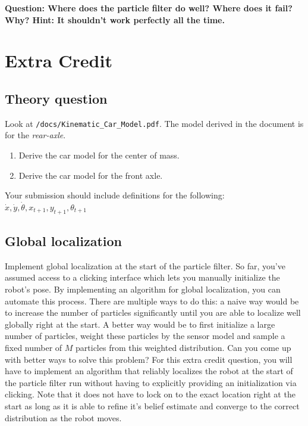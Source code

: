 \documentclass[final]{article}
\begin{document}
\textbf{Question: Where does the particle filter do well? Where does it fail? Why?
Hint: It shouldn't work perfectly all the time.}

\section{Extra Credit}

\subsection{Theory question}
Look at \texttt{/docs/Kinematic\_Car\_Model.pdf}. The model derived in the document is for the \emph{rear-axle}. 

\begin{enumerate}
	\item Derive the car model for the center of mass. 
	\item Derive the car model for the front axle.
\end{enumerate}

Your submission should include definitions for the following: \(\dot{x},\dot{y},\dot{\theta},x_{t+1}, y_{t+1},\theta_{t+1}\)

\subsection{Global localization}

Implement global localization at the start of the particle filter. So far, you’ve assumed access to a
clicking interface which lets you manually initialize the robot’s pose. By implementing an algorithm
for global localization, you can automate this process. There are multiple ways to do this: a naive
way would be to increase the number of particles significantly until you are able to localize well
globally right at the start. A better way would be to first initialize a large number of particles, weight
these particles by the sensor model and sample a fixed number of $M$ particles from this weighted
distribution. Can you come up with better ways to solve this problem? For this extra credit question,
you will have to implement an algorithm that reliably localizes the robot at the start of the particle
filter run without having to explicitly providing an initialization via clicking. Note that it does not
have to lock on to the exact location right at the start as long as it is able to refine it’s belief estimate
and converge to the correct distribution as the robot moves. 
\end{document}
